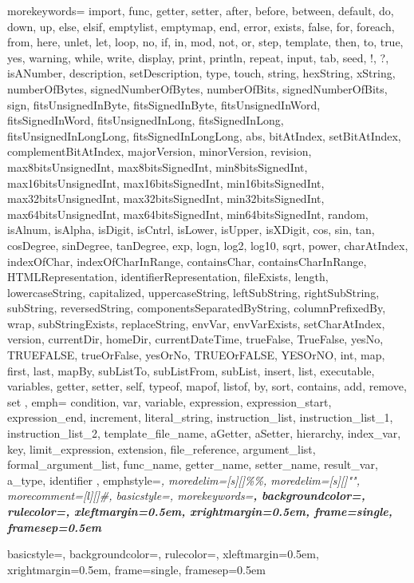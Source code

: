 {
  morekeywords= {
	  import,
	  func,
	  getter,
	  setter,
	  after,
	  before,
	  between,
	  default,
	  do,
	  down,
	  up,
	  else,
	  elsif,
	  emptylist,
	  emptymap,
	  end,
	  error,
	  exists,
	  false,
	  for,
	  foreach,
	  from,
	  here,
	  unlet,
	  let,
	  loop,
	  no,
	  if,
	  in,
	  mod,
	  not,
	  or,
	  step,
	  template,
	  then,
	  to,
	  true,
	  yes,
	  warning,
	  while,
	  write,
	  display,
	  print,
	  println,
	  repeat,
	  input,
	  tab,
	  seed,
	  !,
	  ?,
	  isANumber,
	  description,
	  setDescription,
	  type,
	  touch,
	  string,
	  hexString,
	  xString,
	  numberOfBytes,
	  signedNumberOfBytes,
	  numberOfBits,
	  signedNumberOfBits,
	  sign,
	  fitsUnsignedInByte,
	  fitsSignedInByte,
	  fitsUnsignedInWord,
	  fitsSignedInWord,
	  fitsUnsignedInLong,
	  fitsSignedInLong,
	  fitsUnsignedInLongLong,
	  fitsSignedInLongLong,
	  abs,
	  bitAtIndex,
	  setBitAtIndex,
	  complementBitAtIndex,
	  majorVersion,
	  minorVersion,
	  revision,
	  max8bitsUnsignedInt,
	  max8bitsSignedInt,
	  min8bitsSignedInt,
	  max16bitsUnsignedInt,
	  max16bitsSignedInt,
	  min16bitsSignedInt,
	  max32bitsUnsignedInt,
	  max32bitsSignedInt,
	  min32bitsSignedInt,
	  max64bitsUnsignedInt,
	  max64bitsSignedInt,
	  min64bitsSignedInt,
	  random,
	  isAlnum,
	  isAlpha,
	  isDigit,
	  isCntrl,
	  isLower,
	  isUpper,
	  isXDigit,
	  cos,
	  sin,
	  tan,
	  cosDegree,
	  sinDegree,
	  tanDegree,
	  exp,
	  logn,
	  log2,
	  log10,
	  sqrt,
	  power,
	  charAtIndex,
	  indexOfChar,
	  indexOfCharInRange,
	  containsChar,
	  containsCharInRange,
	  HTMLRepresentation,
	  identifierRepresentation,
	  fileExists,
	  length,
	  lowercaseString,
	  capitalized,
	  uppercaseString,
	  leftSubString,
	  rightSubString,
	  subString,
	  reversedString,
	  componentsSeparatedByString,
	  columnPrefixedBy,
	  wrap,
	  subStringExists,
	  replaceString,
	  envVar,
	  envVarExists,
	  setCharAtIndex,
	  version,
	  currentDir,
	  homeDir,
	  currentDateTime,
	  trueFalse,
	  TrueFalse,
	  yesNo,
	  TRUEFALSE,
	  trueOrFalse,
	  yesOrNo,
	  TRUEOrFALSE,
	  YESOrNO,
	  int,
	  map,
	  first,
	  last,
	  mapBy,
	  subListTo,
	  subListFrom,
	  subList,
	  insert,
	  list,
	  executable,
	  variables,
	  getter,
	  setter,
	  self,
	  typeof,
	  mapof,
	  listof,
	  by,
	  sort,
	  contains,
	  add,
	  remove,
	  set
	},
  emph={
    condition,
    var,
    variable,
    expression,
    expression_start,
    expression_end,
    increment,
    literal_string,
    instruction_list,
    instruction_list_1,
    instruction_list_2,
    template_file_name,
    aGetter,
    aSetter,
    hierarchy,
    index_var,
    key,
    limit_expression,
    extension,
    file_reference,
    argument_list,
    formal_argument_list,
    func_name,
    getter_name,
    setter_name,
    result_var,
    a_type,
    identifier
  },
  emphstyle=\itshape,
  moredelim=[s][\color{blue}]{\%}{\%},
  moredelim=[s][\color{seagreen}]{"}{"},
  morecomment=[l][\color{medium-marroon}\itshape]{\#},
  basicstyle=\ttfamily\footnotesize,
  morekeywords=\bfseries,
  backgroundcolor=\color{light-blue},
  rulecolor=\color{light-blue},
  xleftmargin=0.5em,
  xrightmargin=0.5em,
  frame=single,
  framesep=0.5em
}

{
  basicstyle=\ttfamily\footnotesize\color{blue},
  backgroundcolor=\color{light-blue},
  rulecolor=\color{light-blue},
  xleftmargin=0.5em,
  xrightmargin=0.5em,
  frame=single,
  framesep=0.5em
}